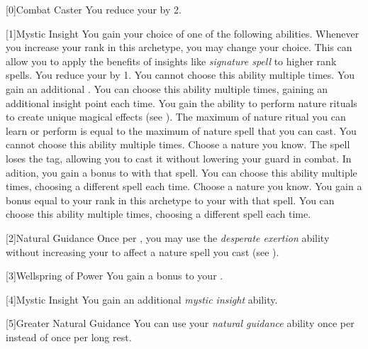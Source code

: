         [0]{Combat Caster} You reduce your  by 2.

        [1]{Mystic Insight}
        You gain your choice of one of the following abilities.
        Whenever you increase your rank in this archetype, you may change your choice.
        This can allow you to apply the benefits of insights like \textit{signature spell} to higher rank spells.
        {
             You reduce your  by 1.
                You cannot choose this ability multiple times.
             You gain an additional .
                You can choose this ability multiple times, gaining an additional insight point each time.
             You gain the ability to perform nature rituals to create unique magical effects (see ).
                The maximum  of nature ritual you can learn or perform is equal to the maximum  of nature spell that you can cast.
                You cannot choose this ability multiple times.
             Choose a nature  you know.
                The spell loses the  tag, allowing you to cast it without lowering your guard in combat.
                In adition, you gain a  bonus to  with that spell.
                You can choose this ability multiple times, choosing a different spell each time.
             Choose a nature  you know.
                You gain a bonus equal to your rank in this archetype to your  with that spell.
                You can choose this ability multiple times, choosing a different spell each time.
        }

        [2]{Natural Guidance} Once per , you may use the \textit{desperate exertion} ability without increasing your  to affect a nature spell you cast (see ).

        [3]{Wellspring of Power}
        You gain a  bonus to your  .

        [4]{Mystic Insight}
        You gain an additional \textit{mystic insight} ability.

        [5]{Greater Natural Guidance} You can use your \textit{natural guidance} ability once per  instead of once per long rest.

